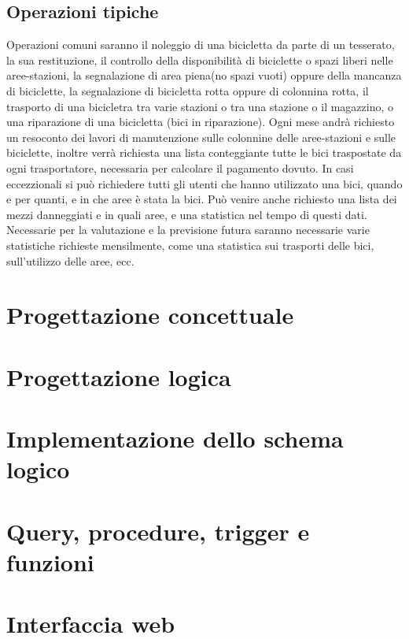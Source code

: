 \documentclass[a4paper,twoside]{article}
\begin{document}
\subsection{Operazioni tipiche}
Operazioni comuni saranno il noleggio di una bicicletta da parte di un tesserato, la sua restituzione, il controllo della disponibilità di biciclette o spazi liberi nelle aree-stazioni, la segnalazione di area piena(no spazi vuoti) oppure della mancanza di biciclette, la segnalazione di bicicletta rotta oppure di colonnina rotta, il trasporto di una bicicletra tra varie stazioni o tra una stazione o il magazzino, o una riparazione di una bicicletta (bici in riparazione).\newline
Ogni mese andrà richiesto un resoconto dei lavori di manutenzione sulle colonnine delle aree-stazioni e sulle biciclette, inoltre verrà richiesta una lista conteggiante tutte le bici traspostate da ogni trasportatore, necessaria per calcolare il pagamento dovuto.\newline
In casi eccezzionali si può richiedere tutti gli utenti che hanno utilizzato una bici, quando e per quanti, e in che aree è stata la bici. Può venire anche richiesto una lista dei mezzi danneggiati e in quali aree, e una statistica nel tempo di questi dati.\newline
%
Necessarie per la valutazione e la previsione futura saranno necessarie varie statistiche richieste mensilmente, come una statistica sui trasporti delle bici, sull'utilizzo delle aree, ecc.
%

\section{Progettazione concettuale}

\section{Progettazione logica}

\section{Implementazione dello schema logico}

\section{Query, procedure, trigger e funzioni}

\section{Interfaccia web}
\end{document}
